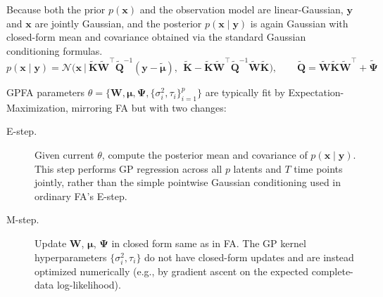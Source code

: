 \documentclass[11pt]{article}
\begin{document}
Because both the prior $p(\mathbf{x})$ and the observation model are linear-Gaussian, $\mathbf{y}$ and $\mathbf{x}$ are jointly Gaussian, and the posterior $p(\mathbf{x} \mid \mathbf{y})$ is again Gaussian with closed-form mean and covariance obtained via the standard Gaussian conditioning formulas.
\[
p(\mathbf{x} \mid \mathbf{y}) = \mathcal{N}\Big(\mathbf{x} \ \Big|\ \tilde{\mathbf{K}}\tilde{\mathbf{W}}^\top \tilde{\mathbf{Q}}^{-1}(\mathbf{y}-\tilde{\boldsymbol{\mu}}),\ \ \tilde{\mathbf{K}} - \tilde{\mathbf{K}}\tilde{\mathbf{W}}^\top\tilde{\mathbf{Q}}^{-1}\tilde{\mathbf{W}}\tilde{\mathbf{K}}\Big), \qquad \tilde{\mathbf{Q}} = \tilde{\mathbf{W}}\tilde{\mathbf{K}}\tilde{\mathbf{W}}^\top + \tilde{\boldsymbol{\Psi}}
\]

GPFA parameters $\theta = \{\mathbf{W}, \boldsymbol{\mu}, \boldsymbol{\Psi}, \{\sigma_i^2, \tau_i\}_{i=1}^p\}$ are typically fit by Expectation-Maximization, mirroring FA but with two changes:

\begin{description}
    \item[E-step.] Given current $\theta$, compute the posterior mean and covariance of $p(\mathbf{x} \mid \mathbf{y})$. This step performs GP regression across all $p$ latents and $T$ time points jointly, rather than the simple pointwise Gaussian conditioning used in ordinary FA's E-step.
    \item[M-step.] Update $\mathbf{W}$, $\boldsymbol{\mu}$, $\boldsymbol{\Psi}$ in closed form same as in FA. The GP kernel hyperparameters $\{\sigma_i^2, \tau_i\}$ do not have closed-form updates and are instead optimized numerically (e.g., by gradient ascent on the expected complete-data log-likelihood).
\end{description}
\end{document}
